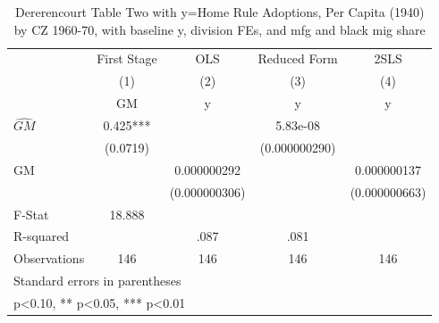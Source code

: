 \begin{table}[htbp]\centering
\def\sym#1{\ifmmode^{#1}\else\(^{#1}\)\fi}
\caption{Dererencourt Table Two with y=Home Rule Adoptions, Per Capita (1940) by CZ 1960-70, with baseline y, division FEs, and mfg and black mig share}
\begin{tabular}{l*{4}{c}}
\toprule
                    & First Stage   &         OLS   &Reduced Form   &        2SLS   \\
                    &\multicolumn{1}{c}{(1)}&\multicolumn{1}{c}{(2)}&\multicolumn{1}{c}{(3)}&\multicolumn{1}{c}{(4)}\\
                    &\multicolumn{1}{c}{GM}&\multicolumn{1}{c}{y}&\multicolumn{1}{c}{y}&\multicolumn{1}{c}{y}\\
\midrule
$\hat{GM}$          &       0.425***&               &    5.83e-08   &               \\
                    &    (0.0719)   &               &(0.000000290)   &               \\
\addlinespace
GM                  &               & 0.000000292   &               & 0.000000137   \\
                    &               &(0.000000306)   &               &(0.000000663)   \\
\midrule
F-Stat              &      18.888   &               &               &               \\
R-squared           &               &        .087   &        .081   &               \\
Observations        &         146   &         146   &         146   &         146   \\
\bottomrule
\multicolumn{5}{l}{\footnotesize Standard errors in parentheses}\\
\multicolumn{5}{l}{\footnotesize * p<0.10, ** p<0.05, *** p<0.01}\\
\end{tabular}
\end{table}
